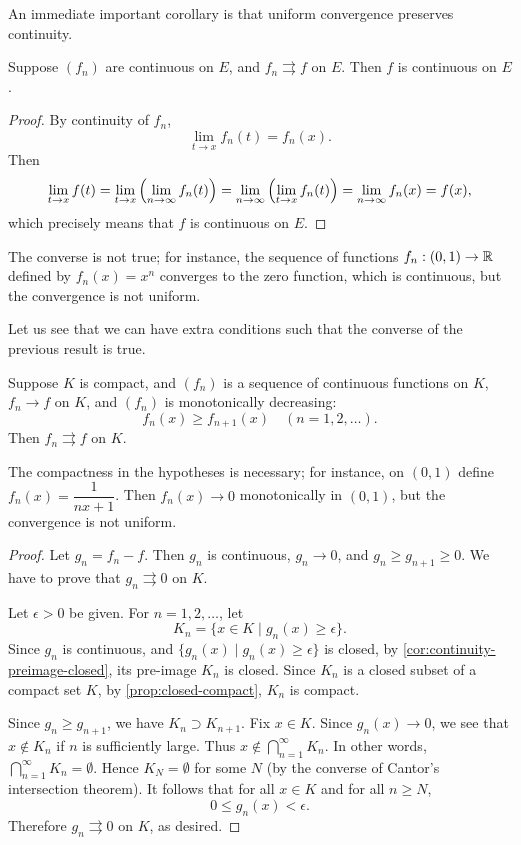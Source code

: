 An immediate important corollary is that uniform convergence preserves continuity.

\begin{corollary}\label{cor:uniform-continuity-preserve-continuity}
Suppose $(f_n)$ are continuous on $E$, and $f_n\rightrightarrows f$ on $E$. Then $f$ is continuous on $E$.
\end{corollary}

\begin{proof}
By continuity of $f_n$,
\[\lim_{t\to x}f_n(t)=f_n(x).\]
Then
\[\lim_{t\to x}f(t)=\lim_{t\to x}\left(\lim_{n\to\infty}f_n(t)\right)=\lim_{n\to\infty}\left(\lim_{t\to x}f_n(t)\right)=\lim_{n\to\infty}f_n(x)=f(x),\]
which precisely means that $f$ is continuous on $E$.
\end{proof}

\begin{remark}
The converse is not true; for instance, the sequence of functions $f_n:(0,1)\to\mathbb R$ defined by $f_n(x)=x^n$ converges to the zero function, which is continuous, but the convergence is not uniform.
\end{remark}

Let us see that we can have extra conditions such that the converse of the previous result is true.

\begin{proposition}
Suppose $K$ is compact, and $(f_n)$ is a sequence of continuous functions on $K$, $f_n\to f$ on $K$, and $(f_n)$ is monotonically decreasing:
\[f_n(x)\ge f_{n+1}(x)\quad(n=1,2,\dots).\]
Then $f_n\rightrightarrows f$ on $K$.
\end{proposition}

\begin{remark}
The compactness in the hypotheses is necessary; for instance, on $(0,1)$ define $f_n(x)=\dfrac{1}{nx+1}$. 
Then $f_n(x)\to0$ monotonically in $(0,1)$, but the convergence is not uniform.
\end{remark}

\begin{proof}
Let $g_n=f_n-f$. Then $g_n$ is continuous, $g_n\to0$, and $g_n\ge g_{n+1}\ge0$. We have to prove that $g_n\rightrightarrows0$ on $K$.

Let $\epsilon>0$ be given. For $n=1,2,\dots$, let
\[K_n=\{x\in K\mid g_n(x)\ge\epsilon\}.\]
Since $g_n$ is continuous, and $\{g_n(x)\mid g_n(x)\ge\epsilon\}$ is closed, by \ref{cor:continuity-preimage-closed}, its pre-image $K_n$ is closed. Since $K_n$ is a closed subset of a compact set $K$, by \ref{prop:closed-compact}, $K_n$ is compact.

Since $g_n\ge g_{n+1}$, we have $K_n\supset K_{n+1}$. Fix $x\in K$. Since $g_n(x)\to0$, we see that $x\notin K_n$ if $n$ is sufficiently large. Thus $x\notin\bigcap_{n=1}^{\infty}K_n$. In other words, $\bigcap_{n=1}^{\infty}K_n=\emptyset$. Hence $K_N=\emptyset$ for some $N$ (by the converse of Cantor's intersection theorem). It follows that for all $x\in K$ and for all $n\ge N$,
\[0\le g_n(x)<\epsilon.\]
Therefore $g_n\rightrightarrows0$ on $K$, as desired.
\end{proof}


